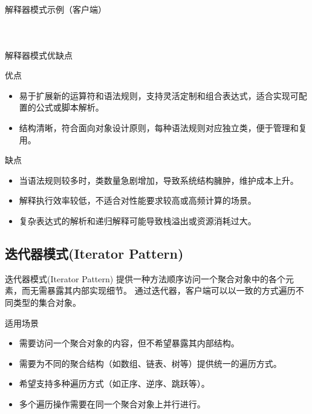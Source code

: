 \documentclass[UTF8,aspectratio=169]{beamer}
\begin{document}
\begin{frame}{解释器模式示例（客户端）}
    \begin{columns}
        \begin{column}{0.48\textwidth}
            \inputminted[firstline=80, lastline=92]{cpp}{code/interpreter_pattern.cpp}
        \end{column}
        \begin{column}{0.48\textwidth}
            \inputminted[firstline=93, lastline=107]{cpp}{code/interpreter_pattern.cpp}
        \end{column}
    \end{columns}
\end{frame}

\begin{frame}{解释器模式优缺点}
    \begin{ytublock}{优点}
        \begin{itemize}
            \item 易于扩展新的运算符和语法规则，支持灵活定制和组合表达式，适合实现可配置的公式或脚本解析。
            \item 结构清晰，符合面向对象设计原则，每种语法规则对应独立类，便于管理和复用。
        \end{itemize}
    \end{ytublock}
    \begin{alertytublock}{缺点}
        \begin{itemize}
            \item 当语法规则较多时，类数量急剧增加，导致系统结构臃肿，维护成本上升。
            \item 解释执行效率较低，不适合对性能要求较高或高频计算的场景。
            \item 复杂表达式的解析和递归解释可能导致栈溢出或资源消耗过大。
        \end{itemize}
    \end{alertytublock}
\end{frame}

\subsection{迭代器模式(Iterator Pattern)}

\begin{frame}{迭代器模式(Iterator Pattern)}
    提供一种方法顺序访问一个聚合对象中的各个元素，而无需暴露其内部实现细节。
    通过迭代器，客户端可以以一致的方式遍历不同类型的集合对象。

    \begin{ytublock}{适用场景}
        \begin{itemize}
            \item 需要访问一个聚合对象的内容，但不希望暴露其内部结构。
            \item 需要为不同的聚合结构（如数组、链表、树等）提供统一的遍历方式。
            \item 希望支持多种遍历方式（如正序、逆序、跳跃等）。
            \item 多个遍历操作需要在同一个聚合对象上并行进行。
        \end{itemize}
    \end{ytublock}
\end{frame}
\end{document}
